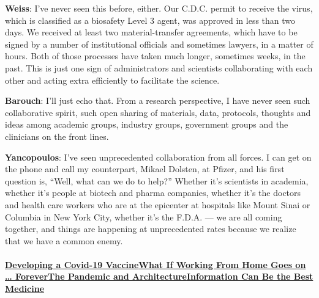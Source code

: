 \textbf{Weiss}: I've never seen this before, either. Our C.D.C. permit
to receive the virus, which is classified as a biosafety Level 3 agent,
was approved in less than two days. We received at least two
material-transfer agreements, which have to be signed by a number of
institutional officials and sometimes lawyers, in a matter of hours.
Both of those processes have taken much longer, sometimes weeks, in the
past. This is just one sign of administrators and scientists
collaborating with each other and acting extra efficiently to facilitate
the science.

\textbf{Barouch}: I'll just echo that. From a research perspective, I
have never seen such collaborative spirit, such open sharing of
materials, data, protocols, thoughts and ideas among academic groups,
industry groups, government groups and the clinicians on the front
lines.

\textbf{Yancopoulos}: I've seen unprecedented collaboration from all
forces. I can get on the phone and call my counterpart, Mikael Dolsten,
at Pfizer, and his first question is, ``Well, what can we do to help?''
Whether it's scientists in academia, whether it's people at biotech and
pharma companies, whether it's the doctors and health care workers who
are at the epicenter at hospitals like Mount Sinai or Columbia in New
York City, whether it's the F.D.A. --- we are all coming together, and
things are happening at unprecedented rates because we realize that we
have a common enemy.

\hypertarget{developing-a-covid-19-vaccinewhat-if-working-from-home-goes-on--foreverthe-pandemic-and-architectureinformation-can-be-the-best-medicine}{%
\paragraph{\texorpdfstring{\href{https://www.nytimes3xbfgragh.onion/interactive/2020/06/09/magazine/covid-vaccine.html}{Developing
a Covid-19
Vaccine}\href{https://www.nytimes3xbfgragh.onion/interactive/2020/06/09/magazine/remote-work-covid.html}{What
If Working From Home Goes on \ldots{}
Forever}\href{https://www.nytimes3xbfgragh.onion/interactive/2020/06/09/magazine/architecture-covid.html}{The
Pandemic and
Architecture}\href{https://www.nytimes3xbfgragh.onion/interactive/2020/06/10/magazine/covid-data.html}{Information
Can Be the Best
Medicine}}{Developing a Covid-19 VaccineWhat If Working From Home Goes on \ldots{} ForeverThe Pandemic and ArchitectureInformation Can Be the Best Medicine}}\label{developing-a-covid-19-vaccinewhat-if-working-from-home-goes-on--foreverthe-pandemic-and-architectureinformation-can-be-the-best-medicine}}


